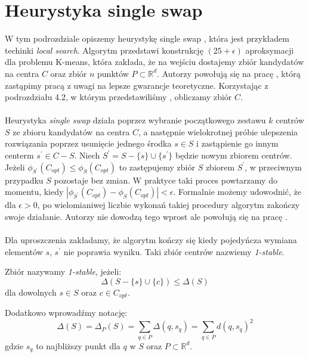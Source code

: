 \section{Heurystyka single swap}

W tym podrozdziale opiszemy heurystykę single swap \cite{Arya2004LocalSH}, która jest przykładem techinki \textit{local search}.
Algorytm przedstawi konstrukcję $(25 + \epsilon)$ aproksymacji dla problemu K-means, która zakłada, że na wejściu dostajemy zbiór kandydatów na centra $C$ oraz zbiór $n$ punktów $P \subset \mathbb{R}^d$.
Autorzy powołują się na pracę \cite{Matousek99onapproximate}, którą zastąpimy pracą \cite{10.1145/1007352.1007400} z uwagi na lepsze gwarancje teoretyczne.
Korzystając z podrozdziału 4.2, w którym przedstawiliśmy \cite{10.1145/1007352.1007400}, obliczamy zbiór $C$.
\\~\\
Heurystyka \textit{single swap} działa poprzez wybranie początkowego zestawu $k$ centrów $S$ ze zbioru kandydatów na centra $C$, a następnie wielokrotnej
próbie ulepszenia rozwiązania poprzez usunięcie jednego środka $s \in S$ i zastąpienie go innym centerm $s^{'} \in C - S$.
Niech $S^{'} = S - \{s\} \cup \{s^{'}\}$ będzie nowym zbiorem centrów.
Jeżeli $\phi_{S^{'}}(C_{opt}) \leq \phi_{S}(C_{opt})$ to zastępujemy zbiór $S$ zbiorem $S^{'}$, w przeciwnym przypadku $S$ pozostaje bez zmian.
W praktyce taki proces powtarzamy do momentu, kiedy $|\phi_{S^{'}}(C_{opt}) - \phi_{S}(C_{opt})| < \epsilon$.
Formalnie możemy udowodnić, że dla $\epsilon > 0$, po wielomianiwej liczbie wykonań takiej procedury algorytm zakończy swoje działanie.
Autorzy nie dowodzą tego wprost ale powołują się na pracę \cite{10.1145/380752.380755}.
\\~\\
Dla uproszczenia zakładamy, że algorytm kończy się kiedy pojedyńcza wymiana elementów $s$, $s^{'}$ nie poprawia wyniku.
Taki zbiór centrów nazwiemy \textit{1-stable}.
\begin{definition}
    Zbiór nazywamy \emph{1-stable}, jeżeli:
    \begin{equation}
        \Delta(S - \{s\} \cup \{c\}) \leq \Delta(S)
    \end{equation}
    dla dowolnych $s \in S$ oraz $c \in C_{opt}$.
\end{definition}

\noindent
Dodatkowo wprowadźmy notację:
\begin{equation}
    \Delta(S) = \Delta_{P}(S) = \sum_{q \in P} \Delta(q,s_{q}) = \sum_{q \in P} d(q, s_{q})^{2}
\end{equation}
gdzie $s_{q}$ to najbliższy punkt dla $q$ w $S$ oraz $P \subset \mathbb{R}^{d}$.

